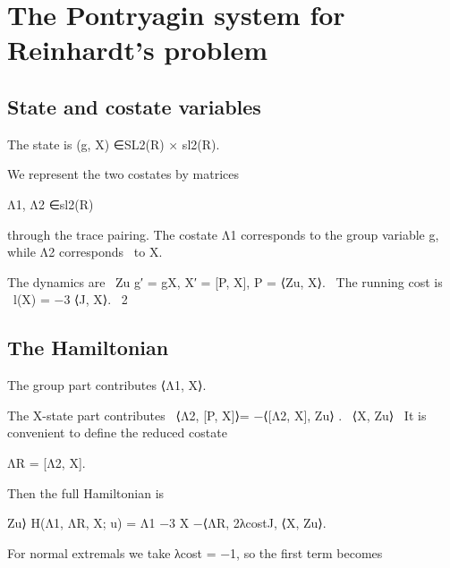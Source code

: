 \chapter{The Pontryagin system for Reinhardt's problem}
\section{State and costate variables}

The state is (g, X) ∈SL2(R) × sl2(R).


We represent the two costates by matrices


\begin{displaytext}
Λ1, Λ2 ∈sl2(R)
\end{displaytext}

\begin{displaytext}
through the trace pairing. The costate Λ1 corresponds to the group variable g, while Λ2 corresponds \
to X.
\end{displaytext}

\begin{displaytext}
The dynamics are \
Zu g′ = gX, X′ = [P, X], P = ⟨Zu, X⟩. \
The running cost is \
l(X) = −3 ⟨J, X⟩. \
2
\end{displaytext}

\section{The Hamiltonian}

The group part contributes ⟨Λ1, X⟩.


\begin{displaytext}
The X-state part contributes \
⟨Λ2, [P, X]⟩= −⟨[Λ2, X], Zu⟩ . \
⟨X, Zu⟩ \
It is convenient to define the reduced costate
\end{displaytext}

\begin{displaytext}
ΛR = [Λ2, X].
\end{displaytext}

Then the full Hamiltonian is


\begin{displaytext}
Zu⟩ H(Λ1, ΛR, X; u) = Λ1 −3 X −⟨ΛR, 2λcostJ, ⟨X, Zu⟩.
\end{displaytext}

\begin{displaytext}
For normal extremals we take λcost = −1, so the first term becomes
\end{displaytext}

